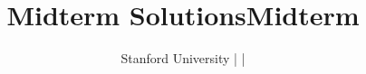 \ifshow
	\newenvironment{floatInSolutions}[3][5.5in]{\begin{textblock*}{#1}(#2,#3) \begingroup \color{NavyBlue}}{\endgroup \end{textblock*}}
	\newenvironment{showInSolutions}{\begingroup \color{NavyBlue}}{\endgroup}
	\newenvironment{mcbox}[3][15]{\begin{pspicture}(0, 0)\psframe[linecolor = NavyBlue](0, #2)(#1, #3)}{\end{pspicture}}
	\title{Midterm \partTitle{} Solutions}
	\newcommand{\correctOption}{\item[\rlap{$\bigcirc$}\ \textcolor{NavyBlue}{$\bullet$}\ ]}
	\newcommand{\incorrectOption}{\item [\rlap{$\bigcirc$}\ \textcolor{white}{$\bullet$}\ ]}
\else
	\title{Midterm \partTitle{}}
	\newcommand{\correctOption}{\item[$\bigcirc$]}
	\newcommand{\incorrectOption}{\item[$\bigcirc$]}
\fi

\author{Stanford University | \course{} | \term{}}
\date{\examDate{}}

\maketitle
